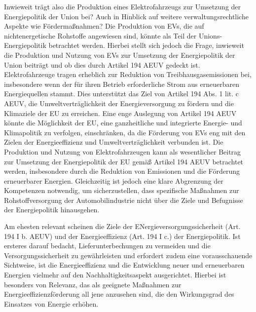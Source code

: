 \documentclass[12pt,a4paper,oneside]{book} %
\begin{document}
	Inwieweit trägt also die Produktion eines Elektrofahrzeugs zur Umsetzung der Energiepolitik der Union bei? Auch in Hinblick auf weitere verwaltungsrechtliche Aspekte wie Fördermaßnahmen?
	Die Produktion von EVs, die auf nichtenergetische Rohstoffe angewiesen sind, könnte als Teil der Unions-Energiepolitik betrachtet werden. Hierbei stellt sich jedoch die Frage, inwieweit die Produktion und Nutzung von EVs zur Umsetzung der Energiepolitik der Union beiträgt und ob dies durch Artikel 194 AEUV gedeckt ist. Elektrofahrzeuge tragen erheblich zur Reduktion von Treibhausgasemissionen bei, insbesondere wenn der für ihren Betrieb erforderliche Strom aus erneuerbaren Energiequellen stammt. Dies unterstützt das Ziel von Artikel 194 Abs. 1 lit. c AEUV, die Umweltverträglichkeit der Energieversorgung zu fördern und die Klimaziele der EU zu erreichen. Eine enge Auslegung von Artikel 194 AEUV könnte die Möglichkeit der EU, eine ganzheitliche und integrierte Energie- und Klimapolitik zu verfolgen, einschränken, da die Förderung von EVs eng mit den Zielen der Energieeffizienz und Umweltverträglichkeit verbunden ist.
	Die Produktion und Nutzung von Elektrofahrzeugen kann als wesentlicher Beitrag zur Umsetzung der Energiepolitik der EU gemäß Artikel 194 AEUV betrachtet werden, insbesondere durch die Reduktion von Emissionen und die Förderung erneuerbarer Energien. Gleichzeitig ist jedoch eine klare Abgrenzung der Kompetenzen notwendig, um sicherzustellen, dass spezifische Maßnahmen zur Rohstoffversorgung der Automobilindustrie nicht über die Ziele und Befugnisse der Energiepolitik hinausgehen.
	
	Am ehesten relevant scheinen die Ziele der ENergieversorgungssicherheit (Art. 194 I b. AEUV) und der Energieeffizienz (Art. 194 I c.) der Energiepolitik. Ist ersteres darauf bedacht, Lieferunterbechungen zu vermeiden und die Versorgungssicherheit zu gewährleisten\autocite[Nettesheim, Art. 194 Rn 16]{grabitz_recht_2024} und erfordert zudem eine vorausschauende Sichtweise\autocite[631]{umbach_europaische_2005}, ist die Energieeffizienz und die Entwicklung neuer und erneuerbaren Energien vielmehr auf den Nachhaltigkeitsaspekt ausgerichtet.\autocite[Nettesheim, Art. 194 Rn 17]{grabitz_recht_2024} Hierbei ist besonders von Relevanz, das als geeignete Maßnahmen zur Energieeffizienzförderung all jene anzusehen sind, die den Wirkungsgrad des Einsatzes von Energie erhöhen.\autocite[Nettesheim, Art. 194 Rn 16]{grabitz_recht_2024}
	
\end{document}

